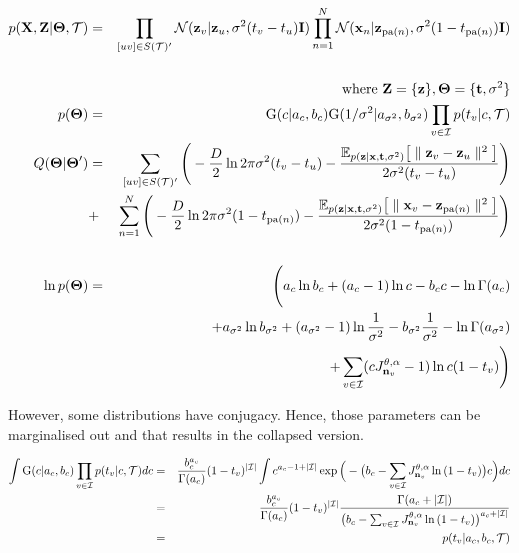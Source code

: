 \documentclass{article}
\begin{document}
	\begin{eqnarray}
		p(\bold{X}, \bold{Z} | \boldsymbol{\Theta}, \mathcal{T}) &=& 
		\prod_{[uv] \in S(\mathcal{T})'} \mathcal{N}(\bold{z}_v|\bold{z}_u, \sigma^2(t_v - t_u)\bold{I}) \prod^N_{n=1} \mathcal{N}(\bold{x}_n|\bold{z}_{\textrm{pa}(n)}, \sigma^2(1 - t_{\textrm{pa}(n)})\bold{I}) \nonumber \\
		& & \\
		& & \textrm{where } \bold{Z} = \{\bold{z} \}, \boldsymbol{\Theta} = \{\bold{t}, \sigma^2\} \nonumber \\
		p(\boldsymbol{\Theta}) &=& \textrm{G}(c | a_c, b_c) \textrm{G}(1/\sigma^2 | a_{\sigma^2}, b_{\sigma^2}) \prod_{v \in \mathcal{I}} p(t_v | c, \mathcal{T}) \\
		Q(\boldsymbol{\Theta} | \boldsymbol{\Theta}') &=& \sum_{[uv] \in S(\mathcal{T})'} \Bigg(-\frac{D}{2}\ln2\pi\sigma^2(t_v - t_u) - \frac{ \mathbb{E}_{p(\bold{z}|\bold{x}, \bold{t}, \sigma^2)} \big[\parallel \bold{z}_v - \bold{z}_u \parallel^2 \big]}{2\sigma^2(t_v - t_u)} \Bigg) \nonumber \\
	 	&+& \sum^N_{n=1} \Bigg(-\frac{D}{2}\ln2\pi\sigma^2(1 - t_{\textrm{pa}(n)}) - \frac{\mathbb{E}_{p(\bold{z}|\bold{x}, \bold{t}, \sigma^2)} \big[ \parallel \bold{x}_v - \bold{z}_{\textrm{pa}(n)} \parallel^2 \big]}{2\sigma^2(1 - t_{\textrm{pa}(n)})} \Bigg) \nonumber \\
	 	& & \\
	 	\ln p(\boldsymbol{\Theta}) &=& \Bigg(a_c \ln{b_c} + (a_c - 1)\ln{c} - b_cc - \ln{\Gamma(a_c)} \nonumber \\
	 	& & + a_{\sigma^2} \ln{b_{\sigma^2}} + (a_{\sigma^2} - 1)\ln{\frac{1}{\sigma^2}} - b_{\sigma^2}\frac{1}{\sigma^2} - \ln{\Gamma(a_{\sigma^2})} \nonumber \\
	 	& & + \sum_{v \in \mathcal{I}} (cJ^{\theta, \alpha}_{\bold{n}_v} - 1) \ln{c(1 - t_v)} \Bigg)
	\end{eqnarray}
	
	However, some distributions have conjugacy. Hence, those parameters can be marginalised out and that results in the collapsed version.
	
	\begin{eqnarray}
		\int \textrm{G}(c | a_c, b_c) \prod_{v \in \mathcal{I}} p(t_v | c, \mathcal{T}) dc &=& \frac{b^{a_c}_c}{\Gamma(a_c)}(1 - t_v)^{|\mathcal{I}|} \int c^{a_c - 1 + |\mathcal{I}|} \exp \Big( - \big( b_c - \sum_{v \in \mathcal{I}} J^{\theta, \alpha}_{\bold{n}_v} \ln{(1 - t_v)} \big) c \Big) dc \nonumber \\
		&=& \frac{b^{a_c}_c}{\Gamma(a_c)}(1 - t_v)^{|\mathcal{I}|} \frac{\Gamma(a_c + |\mathcal{I}|)}{\big( b_c - \sum_{v \in \mathcal{I}} J^{\theta, \alpha}_{\bold{n}_v} \ln{(1 - t_v)} \big)^{a_c + |\mathcal{I}|}} \nonumber \\
		&=& p(t_v | a_c, b_c, \mathcal{T})
	\end{eqnarray}
\end{document}
